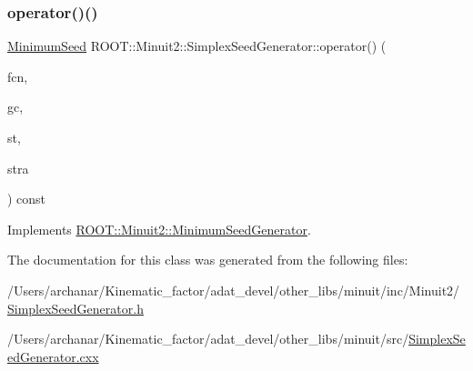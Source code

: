 \subsubsection{\texorpdfstring{operator()()}{operator()()}\hspace{0.1cm}{\footnotesize\ttfamily [4/4]}}
{\footnotesize\ttfamily \mbox{\hyperlink{classROOT_1_1Minuit2_1_1MinimumSeed}{Minimum\+Seed}} R\+O\+O\+T\+::\+Minuit2\+::\+Simplex\+Seed\+Generator\+::operator() (\begin{DoxyParamCaption}\item[{const \mbox{\hyperlink{classROOT_1_1Minuit2_1_1MnFcn}{Mn\+Fcn}} \&}]{fcn,  }\item[{const \mbox{\hyperlink{classROOT_1_1Minuit2_1_1AnalyticalGradientCalculator}{Analytical\+Gradient\+Calculator}} \&}]{gc,  }\item[{const \mbox{\hyperlink{classROOT_1_1Minuit2_1_1MnUserParameterState}{Mn\+User\+Parameter\+State}} \&}]{st,  }\item[{const \mbox{\hyperlink{classROOT_1_1Minuit2_1_1MnStrategy}{Mn\+Strategy}} \&}]{stra }\end{DoxyParamCaption}) const\hspace{0.3cm}{\ttfamily [virtual]}}



Implements \mbox{\hyperlink{classROOT_1_1Minuit2_1_1MinimumSeedGenerator_a670b9671c73d7e0d3caa148e82d4b2fa}{R\+O\+O\+T\+::\+Minuit2\+::\+Minimum\+Seed\+Generator}}.



The documentation for this class was generated from the following files\+:\begin{DoxyCompactItemize}
\item 
/\+Users/archanar/\+Kinematic\+\_\+factor/adat\+\_\+devel/other\+\_\+libs/minuit/inc/\+Minuit2/\mbox{\hyperlink{other__libs_2minuit_2inc_2Minuit2_2SimplexSeedGenerator_8h}{Simplex\+Seed\+Generator.\+h}}\item 
/\+Users/archanar/\+Kinematic\+\_\+factor/adat\+\_\+devel/other\+\_\+libs/minuit/src/\mbox{\hyperlink{SimplexSeedGenerator_8cxx}{Simplex\+Seed\+Generator.\+cxx}}\end{DoxyCompactItemize}
